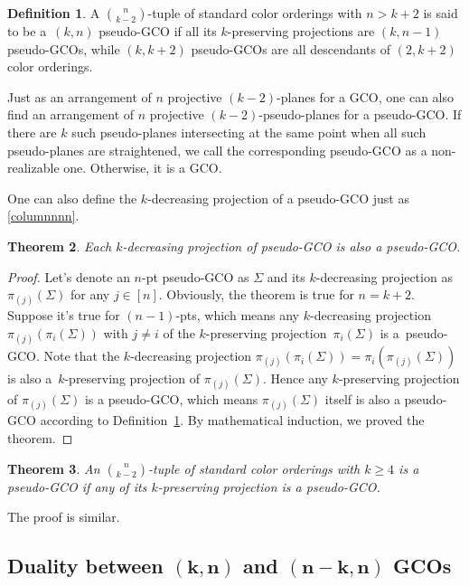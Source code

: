 \documentclass[pdftex]{sigma}
\newtheorem{thm}{Theorem}[section]
\theoremstyle{definition}
\newtheorem{defn}[thm]{Definition}
\numberwithin{equation}{section}
\begin{document}
\begin{defn}\label{generalpseudoGCO}
 A ${n \choose k-2}$-tuple of standard color orderings with $n>k+2$ is said to be a~$(k,n)$ pseudo-GCO if all its $k$-preserving projections are $(k,n-1)$ pseudo-GCOs, while $(k,k+2)$ pseudo-GCOs are all descendants of $(2,k+2)$ color orderings.
\end{defn}

Just as an arrangement of $n$ projective $(k-2)$-planes for a GCO, one can also find an arrangement of $n$ projective $(k-2)$-pseudo-planes for a pseudo-GCO. If there are
$k$ such pseudo-planes intersecting at the same point
when all such pseudo-planes are straightened, we call the corresponding
pseudo-GCO as a non-realizable one. Otherwise, it is a GCO.

One can also define the $k$-decreasing projection of a pseudo-GCO just as \eqref{columnnnn}.
\begin{thm}
\label{theoremcondition1}
Each $k$-decreasing projection of pseudo-GCO is also a pseudo-GCO.
\end{thm}

\begin{proof}
Let's denote an $n$-pt pseudo-GCO as $\Sigma $ and its $k$-decreasing projection as $\pi_{(j)}(\Sigma)$ for any $j\in [n]$.
Obviously, the theorem is true for $n=k+2$.
Suppose it's true for $(n-1)$-pts, which means any $k$-decreasing projection $
\pi_{(j)}\left(
\pi_i\left(\Sigma \right)
\right)
$ with $j\neq i$ of the $k$-preserving projection~$
\pi_i\left(\Sigma \right)
$ is a~pseudo-GCO. Note that the $k$-decreasing projection
$
\pi_{(j)}\left(
\pi_i\left(\Sigma \right)
\right) =
\pi_i\left(\pi_{(j)}(\Sigma)
\right)
$
is also a~$k$-preserving projection of $\pi_{(j)}(\Sigma) $. Hence any $k$-preserving projection of $\pi_{(j)}(\Sigma)$ is a pseudo-GCO, which means $\pi_{(j)}(\Sigma) $ itself is also a pseudo-GCO according to Definition~\ref{generalpseudoGCO}.
By mathematical induction, we proved the theorem.
\end{proof}

\begin{thm}
\label{theoremcondition2}
An ${n \choose k-2}$-tuple of standard color orderings with $k\geq4$ is a pseudo-GCO if any of its $k$-preserving projection is a pseudo-GCO.
\end{thm}
The proof is similar.



\subsection[Duality between (k,n) and (n-k,n) GCOs]{Duality between $\boldsymbol{(k,n)}$ and $\boldsymbol{(n-k,n)}$ GCOs}
\end{document}
